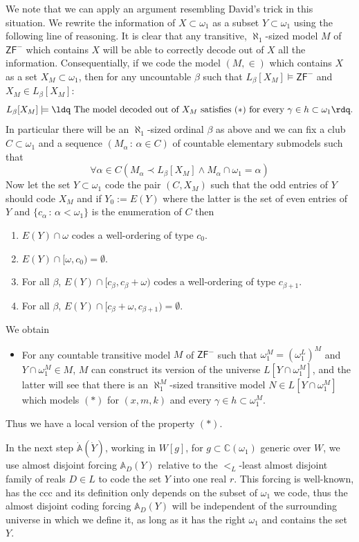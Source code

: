 \documentclass[a4paper,11pt]{article}
\newcommand{\ZFP}{\mathsf{ZF}^-}
\begin{document}
We note that we can apply an argument resembling David's trick in this situation. We rewrite the information of $X \subset \omega_1$ as a subset $Y \subset \omega_1$ using the following line of reasoning.
It is clear that any transitive, $\aleph_1$-sized model $M$ of $\ZFP$ which contains $X$ will be able to correctly decode out of $X$ all the information.
Consequentially, if we code the model $(M,\in)$ which contains $X$ as a set $X_M \subset \omega_1$, then for any uncountable $\beta$ such that $L_{\beta}[X_M] \models \ZFP$ and $X_M \in L_{\beta}[X_M]$:
\[L_{\beta}[X_M] \models \text{\ldq The model decoded out of }X_M \text{ satisfies $(\ast)$ for every $\gamma \in h \subset \omega_1$\rdq.} \]
In particular there will be an $\aleph_1$-sized ordinal $\beta$ as above and we can fix a club $C \subset \omega_1$ and a sequence $(M_{\alpha} \, : \, \alpha \in C)$ of countable elementary submodels such that
\[\forall \alpha \in C (M_{\alpha} \prec L_{\beta}[X_M] \land M_{\alpha} \cap \omega_1 = \alpha)\]
Now let the set $Y\subset \omega_1$ code the pair $(C, X_M)$ such that the odd entries of $Y$ should code $X_M$ and if $Y_0:=E(Y)$ where the latter is the set of even entries of $Y$ and $\{c_{\alpha} \, : \, \alpha < \omega_1\}$ is the enumeration of $C$ then
\begin{enumerate}
\item $E(Y) \cap \omega$ codes a well-ordering of type $c_0$.
\item $E(Y) \cap [\omega, c_0) = \emptyset$.
\item For all $\beta$, $E(Y) \cap [c_{\beta}, c_{\beta} + \omega)$ codes a well-ordering of type $c_{\beta+1}$.
\item For all $\beta$, $E(Y) \cap [c_{\beta}+\omega, c_{\beta+1})= \emptyset$.
\end{enumerate}
We obtain
\begin{itemize}
\item[$({\ast}{\ast})$] For any countable transitive model $M$ of $\ZFP$ such that $\omega_1^M=(\omega_1^L)^M$ and $ Y \cap \omega_1^M \in M$, $M$ can construct its version of the universe $L[Y \cap \omega_1^M]$, and the latter will see that there is an $\aleph_1^M$-sized transitive model $N \in L[Y \cap \omega_1^M]$ which models $(\ast)$ for $(x,m,k)$ and every $\gamma \in h \subset \omega_1^M$.
\end{itemize}
Thus we have a local version of the property $(\ast)$.

In the next step $\dot{\mathbb{A}} (\dot{Y})$, working in $W[g]$, for $g\subset \mathbb{C} (\omega_1)$ generic over $W$, we use almost disjoint forcing $\mathbb{A}_D(Y)$ relative to the $<_L$-least almost disjoint family of reals $D \in  L $ to code the set $Y$ into one real $r$. This forcing is well-known, has the ccc and its definition only depends on the subset of $\omega_1$ we code, thus the almost disjoint coding forcing  $\mathbb{A}_D(Y)$ will be independent of the surrounding universe in which we define it, as long as it has the right $\omega_1$ and contains the set $Y$.
\end{document}
